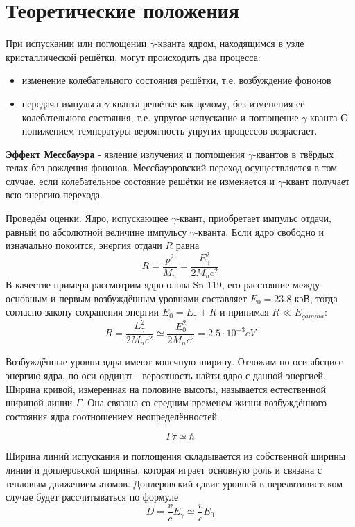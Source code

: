 \documentclass[a4paper]{article}
\begin{document}
\section{Теоретические положения}
При испускании или поглощении $\gamma$-кванта ядром, находящимся в узле кристаллической решётки, могут происходить два процесса:
\begin{itemize}
    \item изменение колебательного состояния решётки, т.е. возбуждение фононов
    \item передача импульса $\gamma$-кванта решётке как целому, без изменения её колебательного состояния, т.е. упругое испускание и поглощение $\gamma$-кванта
С понижением температуры вероятность упругих процессов возрастает. 
\end{itemize}
\textbf{Эффект Мессбауэра} - явление излучения и поглощения $\gamma$-квантов в твёрдых телах без рождения фононов. Мессбауэровский переход осуществляется в том случае, если колебательное состояние решётки не изменяется и $\gamma$-квант получает всю энергию перехода. \par
Проведём оценки. Ядро, испускающее $\gamma$-квант, приобретает импульс отдачи, равный по абсолютной величине импульсу $\gamma$-кванта. Если ядро свободно и изначально покоится, энергия отдачи $R$ равна
\begin{equation}
    R = \frac{p^2}{M_n} = \frac{E_{\gamma}^2}{2 M_n c^2}
\end{equation}
В качестве примера рассмотрим ядро олова Sn-119, его расстояние между основным и первым возбуждённым уровнями составляет $E_0 = 23.8$ кэВ, тогда согласно закону сохранения энергии $E_0 = E_{\gamma} + R$ и принимая $R \ll E_{gamma}$:
\begin{equation}
    R = \frac{E_{\gamma}^2}{2 M_n c^2} \simeq \frac{E_0^2}{2 M_n c^2} = 2.5 \cdot 10^{-3} eV
\end{equation}

Возбуждённые уровни ядра имеют конечную ширину. Отложим по оси абсцисс энергию ядра, по оси ординат - вероятность найти ядро с данной энергией. Ширина кривой, измеренная на половине высоты, называется естественной шириной линии $\Gamma$. Она связана со средним временем жизни возбуждённого состояния ядра соотношением неопределённостей.

\begin{equation}
    \Gamma \tau \simeq \hbar
\end{equation}

Ширина линий испускания и поглощения складывается из собственной ширины линии и доплеровской ширины, которая играет основную роль и связана с тепловым движением атомов. Доплеровский сдвиг уровней в нерелятивистском случае будет рассчитываться по формуле
\begin{equation}
    D = \frac{v}{c}E_{\gamma} \simeq \frac{v}{c}E_0
\end{equation}
\end{document}
